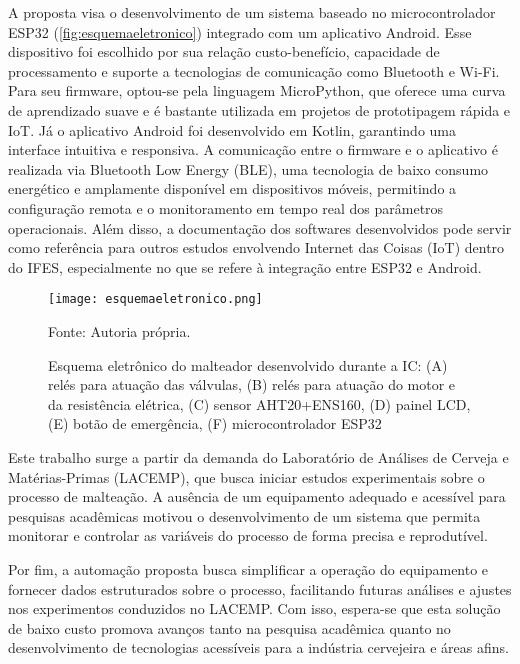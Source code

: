 A proposta visa o desenvolvimento de um sistema baseado no microcontrolador ESP32 (\autoref{fig:esquemaeletronico}) integrado com um aplicativo Android. Esse dispositivo foi escolhido por sua relação custo-benefício, capacidade de processamento e suporte a tecnologias de comunicação como Bluetooth e Wi-Fi. Para seu firmware, optou-se pela linguagem MicroPython, que oferece uma curva de aprendizado suave e é bastante utilizada em projetos de prototipagem rápida e IoT. Já o aplicativo Android foi desenvolvido em Kotlin, garantindo uma interface intuitiva e responsiva. A comunicação entre o firmware e o aplicativo é realizada via Bluetooth Low Energy (BLE), uma tecnologia de baixo consumo energético e amplamente disponível em dispositivos móveis, permitindo a configuração remota e o monitoramento em tempo real dos parâmetros operacionais. Além disso, a documentação dos softwares desenvolvidos pode servir como referência para outros estudos envolvendo Internet das Coisas (IoT) dentro do IFES, especialmente no que se refere à integração entre ESP32 e Android.

\begin{figure}[ht]
    \centering
    \caption{Esquema eletrônico do malteador desenvolvido durante a IC: (A) relés para atuação das válvulas, (B) relés para atuação do motor e da resistência elétrica, (C) sensor AHT20+ENS160, (D) painel LCD, (E) botão de emergência, (F) microcontrolador ESP32}
    \label{fig:esquemaeletronico}
    \texttt{[image: esquemaeletronico.png]}

    {\centering\footnotesize Fonte: Autoria própria.\par}
\end{figure}


Este trabalho surge a partir da demanda do Laboratório de Análises de Cerveja e Matérias-Primas (LACEMP), que busca iniciar estudos experimentais sobre o processo de malteação. A ausência de um equipamento adequado e acessível para pesquisas acadêmicas motivou o desenvolvimento de um sistema que permita monitorar e controlar as variáveis do processo de forma precisa e reprodutível. 

Por fim, a automação proposta busca simplificar a operação do equipamento e fornecer dados estruturados sobre o processo, facilitando futuras análises e ajustes nos experimentos conduzidos no LACEMP. Com isso, espera-se que esta solução de baixo custo promova avanços tanto na pesquisa acadêmica quanto no desenvolvimento de tecnologias acessíveis para a indústria cervejeira e áreas afins.